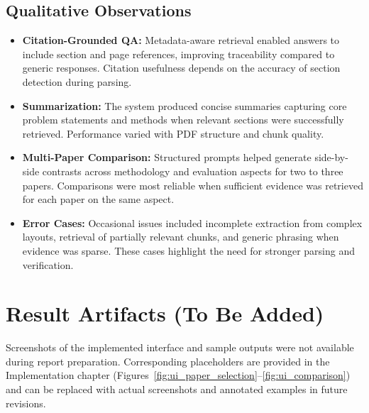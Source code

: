 \subsection{Qualitative Observations}
\begin{itemize}
    \item \textbf{Citation-Grounded QA:} Metadata-aware retrieval enabled answers to include section and page references, improving traceability compared to generic responses. Citation usefulness depends on the accuracy of section detection during parsing.
    \item \textbf{Summarization:} The system produced concise summaries capturing core problem statements and methods when relevant sections were successfully retrieved. Performance varied with PDF structure and chunk quality.
    \item \textbf{Multi-Paper Comparison:} Structured prompts helped generate side-by-side contrasts across methodology and evaluation aspects for two to three papers. Comparisons were most reliable when sufficient evidence was retrieved for each paper on the same aspect.
    \item \textbf{Error Cases:} Occasional issues included incomplete extraction from complex layouts, retrieval of partially relevant chunks, and generic phrasing when evidence was sparse. These cases highlight the need for stronger parsing and verification.
\end{itemize}

\section{Result Artifacts (To Be Added)}
Screenshots of the implemented interface and sample outputs were not available during report preparation. Corresponding placeholders are provided in the Implementation chapter (Figures~\ref{fig:ui_paper_selection}--\ref{fig:ui_comparison}) and can be replaced with actual screenshots and annotated examples in future revisions.